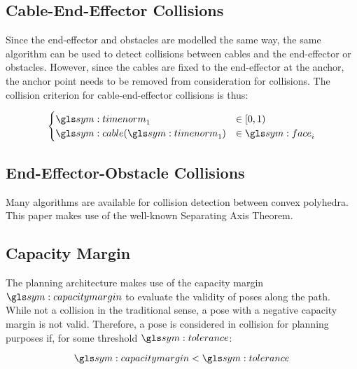 	\subsection{Cable-End-Effector Collisions}

		Since the end-effector and obstacles are modelled the same way, the same
		algorithm can be used to detect collisions between cables and the
		end-effector or obstacles. However, since the cables are fixed to the
		end-effector at the anchor, the anchor point needs to be removed from
		consideration for collisions. The collision criterion for
		cable-end-effector collisions is thus:

		\begin{equation}
			\begin{cases}
				\timenorm_1 &\in [0, 1)\\
				\cable(\timenorm_1) &\in \face_i
			\end{cases}
			\label{eq:cable_robot_collision_condition}
		\end{equation}

	\subsection{End-Effector-Obstacle Collisions}

		Many algorithms are available for collision detection between convex
		polyhedra. This paper makes use of the well-known Separating Axis
		Theorem. 

	\subsection{Capacity Margin}

		The planning architecture makes use of the capacity margin
		$\capacitymargin$ to evaluate the validity of poses along the path.
		While not a collision in the traditional sense, a pose with a negative
		capacity margin is not valid. Therefore, a pose is considered in
		collision for planning purposes if, for some threshold $\tol$:

		\begin{equation}
			\capacitymargin < \tol
		\end{equation}
